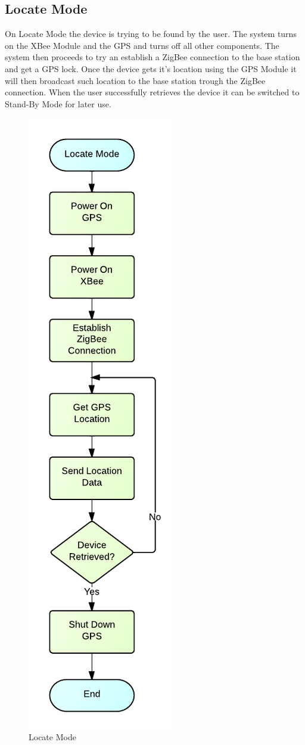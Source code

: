 \subsection{Locate Mode}
On Locate Mode the device is trying to be found by the user. The system turns on the XBee Module and the GPS and turns off all other components. The system then proceeds to try an establish a ZigBee connection to the base station and get a GPS lock. Once the device gets it's location using the GPS Module it will then broadcast such location to the base station trough the ZigBee connection. When the user successfully retrieves the device it can be switched to Stand-By Mode for later use.
\begin{figure}[H]
	\centering
	\includegraphics[scale=1.0]{img/LocateMode}
	\caption{Locate Mode \label{fig:locateMode}}
\end{figure}

